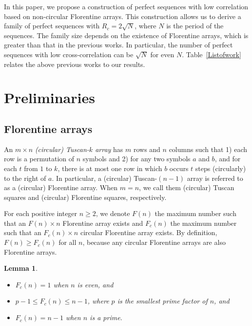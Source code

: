 \documentclass[conference,letterpaper]{IEEEtran}
\newtheorem{lemma}{Lemma}
\theoremstyle{definition}
\begin{document}
In this paper, we propose a construction of perfect sequences with low correlation based on non-circular Florentine arrays. This construction allows us to derive a family of perfect sequences with $R_{c}=2\sqrt{N}$, where $N$ is the period of the sequences. 
The family size depends on the existence of Florentine arrays, which is greater than that in the previous works. In particular, the number of perfect sequences with low cross-correlation can be $\sqrt{N}$ for even $N$. Table~\ref{Listofwork} relates the above previous works to our results.



 

\section{Preliminaries}\label{sec-pre}


\subsection{Florentine arrays}
An $m \times n$  \textit{(circular) Tuscan-$k$  array }has $m$ rows and $n$ columns such that 1) each row is a permutation of
$n$ symbols and 2) for any two symbols $a$ and $b$, and for
each $t$ from $1$ to $k$, there is at most one row in which $b$ occurs  $t$ steps (circularly) to the right of $a$. In  particular, a (circular) Tuscan-$(n-1)$ array is referred to as a (circular) Florentine array. When $m=n$, we call them (circular) Tuscan squares and (circular) Florentine squares, respectively. 

 
For each positive integer $n \geq2$, 
 we denote $F(n)$ the maximum number such that an $F(n) \times n$ Florentine array exists and $F_{c}(n)$ the maximum number such that an $F_{c}(n) \times n$ circular Florentine array exists. By definition, $F(n) \geq F_{c}(n)$ for all $n$, because any circular Florentine arrays are also Florentine arrays.
 
\begin{lemma} \cite{HSong}  \label{CircularFB}
\begin{itemize}
\item[(1)] $F_{c}(n)=1$  when $n$ is even, and
\item[(2)] $p-1 \leq F_{c}(n) \leq n-1$, where $p$ is the smallest prime factor of $n$, and 
\item[(3)] $F_{c}(n) = n-1$  when $n$ is a prime.
\end{itemize}
\end{lemma}
\end{document}

